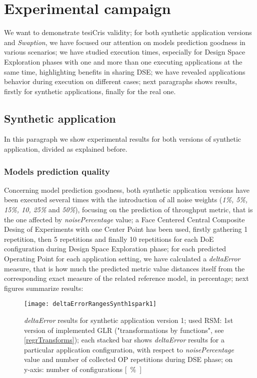 \section{Experimental campaign}

We want to demonstrate tesiCris validity; for both synthetic application versions and \textit{Swaption}, we have focused our attention on models prediction goodness in various scenarios; we have studied execution times, especially for Design Space Exploration phases with one and more than one executing applications at the same time, highlighting benefits in sharing DSE; we have revealed applications behavior during execution on different cases; next paragraphs shows results, firstly for synthetic applications, finally for the real one.


\subsection{Synthetic application}

In this paragraph we show experimental results for both versions of synthetic application, divided as explained before.


\subsubsection{Models prediction quality}\label{deltaErrorExplanation}

Concerning model prediction goodness, both synthetic application versions have been executed several times with the introduction of all noise weights (\textit{1\%, 5\%, 15\%, 10, 25\%} and \textit{50\%}), focusing on the prediction of throughput metric, that is the one affected by \textit{noisePercentage} value; a Face Centered Central Composite Desing of Experiments with one Center Point has been used, firstly gathering 1 repetition, then 5 repetitions and finally 10 repetitions for each DoE configuration during Design Space Exploration phase; for each predicted Operating Point for each application setting, we have calculated a \textit{deltaError} measure, that is how much the predicted metric value distances itself from the corresponding exact measure of the related reference model, in percentage; next figures summarize results:





\begin{figure}[H]

    \centering
    
    \texttt{[image: deltaErrorRangesSynth1spark1]}
    
     \caption{\textit{deltaError} results for synthetic application version 1; used RSM: 1st version of implemented GLR ("transformations by functions", see \ref{regrTransforms}); each stacked bar shows \textit{deltaError} results for a particular application configuration, with respect to \textit{noisePercentage} value and number of collected OP repetitions during DSE phase; on y-axis: number of configurations \hbox{[ \% ]}}
    
    \label{fig::synth1spark1::intervals}
    
\end{figure}

